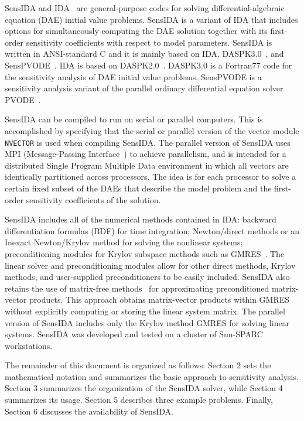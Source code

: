 SensIDA and IDA~\cite{IDA_UG} are general-purpose codes for solving
differential-algebraic equation (DAE) initial value problems.
SensIDA is a variant of IDA that includes options for simultaneously
computing the DAE solution together with its first-order sensitivity
coefficients with respect to model parameters.
SensIDA is written in ANSI-standard C and it is mainly based on IDA,
DASPK3.0~\cite{DASPK3}, and SensPVODE~\cite{SensPVODE_UG}.
IDA is based on DASPK2.0~\cite{DASPK2}.
DASPK3.0 is a Fortran77 code for the sensitivity analysis of DAE
initial value problems.
SensPVODE is a sensitivity analysis variant of the parallel ordinary
differential equation solver PVODE~\cite{PVODE_UG}.

SensIDA can be compiled to run on serial or parallel computers.
This is accomplished by specifying that the serial or parallel
version of the vector module {\tt NVECTOR} is used when compiling SensIDA.
The parallel version of SensIDA uses MPI (Message-Passing
Interface~\cite{MPI}) to achieve parallelism, and is intended for
a distributed Single Program Multiple Data environment in which all
vectors are identically partitioned across processors.
The idea is for each processor to solve a certain fixed subset of the
DAEs that describe the model problem and the first-order sensitivity
coefficients of the solution.

SensIDA includes all of the numerical methods contained in IDA:
backward differentiation formulas (BDF) for time integration;
Newton/direct methods or an Inexact Newton/Krylov method for solving
the nonlinear systems; preconditioning modules for Krylov subspace
methods such as GMRES~\cite{GMRES}.
The linear solver and preconditioning modules allow for other direct
methods, Krylov methods, and user-supplied preconditioners to be
easily included.
SensIDA also retains the use of matrix-free methods~\cite{BH89}
for approximating preconditioned matrix-vector products. 
This approach obtains matrix-vector products within GMRES without
explicitly computing or storing the linear system matrix.
The parallel version of SensIDA includes only the Krylov method GMRES
for solving linear systems.
SensIDA was developed and tested on a cluster of Sun-SPARC
workstations.

The remainder of this document is organized as follows:
Section 2 sets the mathematical notation and summarizes the basic
approach to sensitivity analysis.
Section 3 summarizes the organization of the SensIDA solver, while
Section 4 summarizes its usage.
Section 5 describes three example problems.
Finally, Section 6 discusses the availability of SensIDA.

